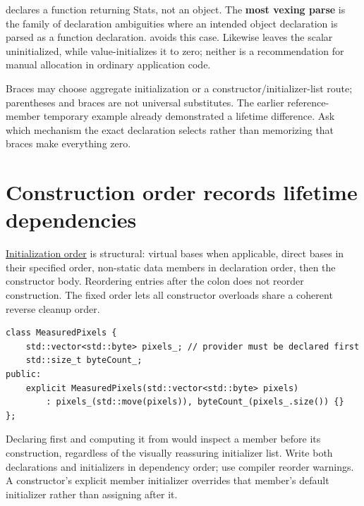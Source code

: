  declares a function returning Stats, not an object. The \textbf{most vexing parse} is the family of declaration ambiguities where an intended object declaration is parsed as a function declaration.  avoids this case. Likewise  leaves the scalar uninitialized, while  value-initializes it to zero; neither is a recommendation for manual allocation in ordinary application code.

Braces may choose aggregate initialization or a constructor/initializer-list route; parentheses and braces are not universal substitutes. The earlier reference-member temporary example already demonstrated a lifetime difference. Ask which mechanism the exact declaration selects rather than memorizing that braces make everything zero.

\section{Construction order records lifetime dependencies}\label{01-foundations-i-ch003-construction-order-records-lifetime-dependencies}

\hypertarget{01-foundations-i-ch003-construction-order-records-lifetime-dependencies}{}

\hyperref[appendix-3cb49709605a]{Initialization order} is structural: virtual bases when applicable, direct bases in their specified order, non-static data members in declaration order, then the constructor body. Reordering entries after the colon does not reorder construction. The fixed order lets all constructor overloads share a coherent reverse cleanup order.

\begin{verbatim}
class MeasuredPixels {
    std::vector<std::byte> pixels_; // provider must be declared first
    std::size_t byteCount_;
public:
    explicit MeasuredPixels(std::vector<std::byte> pixels)
        : pixels_(std::move(pixels)), byteCount_(pixels_.size()) {}
};
\end{verbatim}

Declaring  first and computing it from  would inspect a member before its construction, regardless of the visually reassuring initializer list. Write both declarations and initializers in dependency order; use compiler reorder warnings. A constructor's explicit member initializer overrides that member's default initializer rather than assigning after it.

